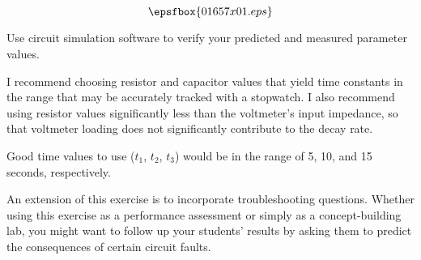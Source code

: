 

$$\epsfbox{01657x01.eps}$$

\vfil \eject






Use circuit simulation software to verify your predicted and measured parameter values.







I recommend choosing resistor and capacitor values that yield time constants in the range that may be accurately tracked with a stopwatch.  I also recommend using resistor values significantly less than the voltmeter's input impedance, so that voltmeter loading does not significantly contribute to the decay rate.

Good time values to use ($t_1$, $t_2$, $t_3$) would be in the range of 5, 10, and 15 seconds, respectively.

An extension of this exercise is to incorporate troubleshooting questions.  Whether using this exercise as a performance assessment or simply as a concept-building lab, you might want to follow up your students' results by asking them to predict the consequences of certain circuit faults.




